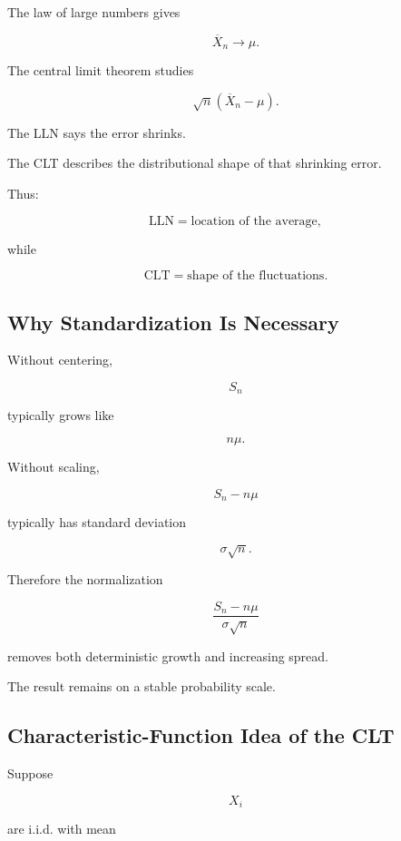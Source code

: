 The law of large numbers gives

\[
\boxed{
\overline{X}_n
\to
\mu.
}
\]

The central limit theorem studies

\[
\boxed{
\sqrt{n}
(\overline{X}_n-\mu).
}
\]

The LLN says the error shrinks.

The CLT describes the distributional shape of that shrinking error.

Thus:

\[
\boxed{
\text{LLN}
=
\text{location of the average},
}
\]

while

\[
\boxed{
\text{CLT}
=
\text{shape of the fluctuations}.
}
\]

\subsection{Why Standardization Is Necessary}
\label{subsec:why-standardization-clt}

Without centering,

\[
S_n
\]

typically grows like

\[
n\mu.
\]

Without scaling,

\[
S_n-n\mu
\]

typically has standard deviation

\[
\sigma\sqrt{n}.
\]

Therefore the normalization

\[
\boxed{
\frac{
S_n-n\mu
}{
\sigma\sqrt{n}
}
}
\]

removes both deterministic growth and increasing spread.

The result remains on a stable probability scale.

\subsection{Characteristic-Function Idea of the CLT}
\label{subsec:cf-proof-clt-idea}

Suppose

\[
X_i
\]

are i.i.d. with mean

